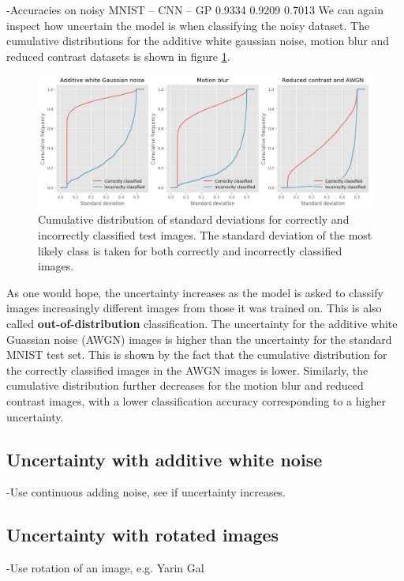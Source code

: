 \documentclass{article}
\begin{document}
-Accuracies on noisy MNIST
-- CNN
-- GP
0.9334
0.9209
0.7013
We can again inspect how uncertain the model is when classifying the noisy dataset. The cumulative distributions for the additive white gaussian noise, motion blur and reduced contrast datasets is shown in figure \ref{fig/noisy_mnist_cum_stds}.

\begin{figure}[h]
	\centering
	\includegraphics[scale=0.4]{noisy_mnist_cum_stds}
	\caption{Cumulative distribution of standard deviations for correctly and incorrectly classified test images. The standard deviation of the most likely class is taken for both correctly and incorrectly classified images.}
	\label{fig/noisy_mnist_cum_stds}
\end{figure}

As one would hope, the uncertainty increases as the model is asked to classify images increasingly different images from those it was trained on. This is also called \textbf{out-of-distribution} classification. The uncertainty for the additive white Guassian noise (AWGN) images is higher than the uncertainty for the standard MNIST test set. This is shown by the fact that the cumulative distribution for the correctly classified images in the AWGN images is lower. Similarly, the cumulative distribution further decreases for the motion blur and reduced contrast images, with a lower classification accuracy corresponding to a higher uncertainty.

\subsection{Uncertainty with additive white noise}

-Use continuous adding noise, see if uncertainty increases.

\subsection{Uncertainty with rotated images}
-Use rotation of an image, e.g. Yarin Gal
\end{document}

